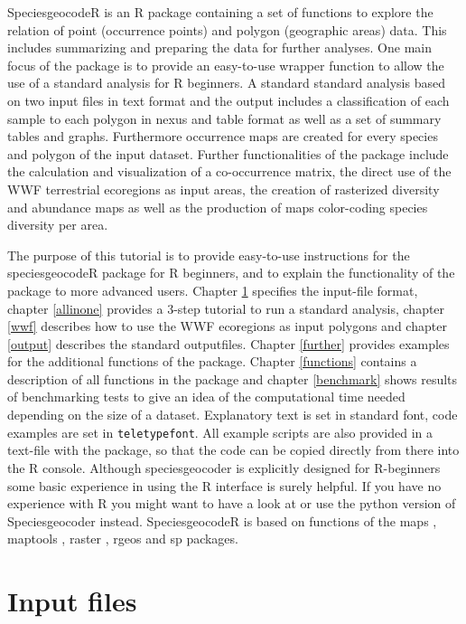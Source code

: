 \documentclass[a4paper,titlepage,11pt]{scrreprt}
\begin{document}
SpeciesgeocodeR is an R package containing a set of functions to explore the relation of point (occurrence points) and polygon (geographic areas) data. This includes summarizing and preparing the data for further analyses. One main focus of the package is to provide an easy-to-use wrapper function to allow the use of a standard analysis for R beginners. A  standard standard analysis based on two input files in text format and the output includes a classification of each sample to each polygon in nexus and table format as well as a set of summary tables and graphs. Furthermore occurrence maps are created for every species and polygon of the input dataset. Further functionalities of the package include the calculation and visualization of a co-occurrence matrix, the direct use of the WWF terrestrial ecoregions as input areas, the creation of rasterized diversity and abundance maps as well as the production of maps color-coding species diversity per area.

The purpose of this tutorial is to provide easy-to-use instructions for the speciesgeocodeR package for R beginners, and to explain the functionality of the package to more advanced users. Chapter \ref{input}  specifies the input-file format, chapter \ref{allinone} provides a 3-step tutorial to run a standard analysis, chapter  \ref{wwf} describes how to use the WWF ecoregions as input polygons and chapter  \ref{output} describes the standard outputfiles. Chapter \ref{further} provides examples for the additional functions of the package. Chapter \ref{functions} contains a description of all functions in the package and chapter \ref{benchmark} shows results of benchmarking tests to give an idea of the computational time needed depending on the size of a dataset. Explanatory text is set in standard font, code examples are set in \texttt{teletypefont}.  All example scripts are also provided in a text-file with the package, so that the code can be copied directly from there into the R console. Although speciesgeocoder is explicitly designed for R-beginners some basic experience in using the R interface is surely helpful. If you have no experience with R you might want to have a look at \citet{crawley2012} or use the python version of Speciesgeocoder \citep{topel2014} instead. SpeciesgeocodeR is based on functions of the
maps \citep{becker2013}, maptools \citep{bivand2013b}, raster \citep{hijmans2014}, rgeos \citep{bivand2014} and sp \citep{pebesma2005, bivand2013}  packages.
\chapter{Input files} \label{input}
\end{document}
